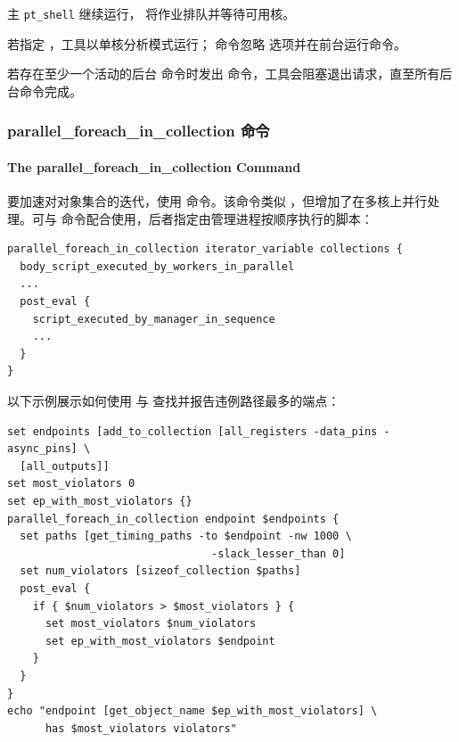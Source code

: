 主 \texttt{pt\_shell} 继续运行， 将作业排队并等待可用核。

若指定 ，工具以单核分析模式运行； 命令忽略  选项并在前台运行命令。

若存在至少一个活动的后台  命令时发出  命令，工具会阻塞退出请求，直至所有后台命令完成。

\subsubsection{parallel\_foreach\_in\_collection 命令}
\paragraph*{The parallel\_foreach\_in\_collection Command}

要加速对对象集合的迭代，使用  命令。该命令类似 ，但增加了在多核上并行处理。可与  命令配合使用，后者指定由管理进程按顺序执行的脚本：
\begin{lstlisting}
parallel_foreach_in_collection iterator_variable collections {
  body_script_executed_by_workers_in_parallel
  ...
  post_eval {
    script_executed_by_manager_in_sequence
    ...
  }
}
\end{lstlisting}

以下示例展示如何使用  与  查找并报告违例路径最多的端点：


\begin{lstlisting}
set endpoints [add_to_collection [all_registers -data_pins -async_pins] \
  [all_outputs]]
set most_violators 0
set ep_with_most_violators {}
parallel_foreach_in_collection endpoint $endpoints {
  set paths [get_timing_paths -to $endpoint -nw 1000 \
                                -slack_lesser_than 0]
  set num_violators [sizeof_collection $paths]
  post_eval {
    if { $num_violators > $most_violators } {
      set most_violators $num_violators
      set ep_with_most_violators $endpoint
    }
  }
}
echo "endpoint [get_object_name $ep_with_most_violators] \
      has $most_violators violators"
\end{lstlisting}


